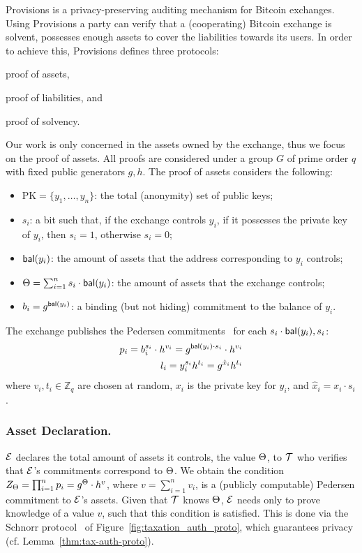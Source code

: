 Provisions is a privacy-preserving auditing mechanism for Bitcoin exchanges.
Using Provisions a party can verify that a (cooperating) Bitcoin exchange is
solvent, \ie possesses enough assets to cover the liabilities towards its
users. In order to achieve this, Provisions defines three protocols:
\begin{inparaenum}[i)]
    \item proof of assets,
    \item proof of liabilities, and
    \item proof of solvency.
\end{inparaenum}
Our work is only concerned in the assets owned by the exchange, thus we focus
on the proof of assets. All proofs are considered under a group $G$ of prime
order $q$ with fixed public generators $g, h$. The proof of assets considers
the following:
\begin{itemize}
    \item $\text{PK} = \{y_1, \dots, y_n \}$: the total (anonymity) set of public keys;
    \item $s_i$: a bit such that, if the exchange controls $y_i$, \ie if it possesses the private key of $y_i$, then $s_i = 1$, otherwise $s_i = 0$;
    \item $\mathsf{bal}(y_i)$: the amount of assets that the address corresponding to $y_i$ controls;
    \item $\Theta = \sum_{i = 1}^n s_i \cdot \mathsf{bal}(y_i)$: the amount of assets that the exchange controls;
    \item $b_i = g^{\mathsf{bal}(y_i)}$: a binding (but not hiding) commitment  to the balance of $y_i$.
\end{itemize}
The exchange publishes the Pedersen commitments~\cite{C:Pedersen91} for each $s_i \cdot
\mathsf{bal}(y_i), s_i$:
\begin{align}
    p_i = b_i^{s_i} \cdot h^{v_i} = g^{\mathsf{bal}(y_i) \cdot s_i} \cdot h^{v_i} \label{eq:balance-commit} \\
    l_i = y_i^{s_i}h^{t_i} =  g^{\hat{x}_i}h^{t_i} \label{eq:ownership-commit}
\end{align}
where $v_i, t_i \in \mathbb{Z}_q$ are chosen at random,
$x_i$ is the private key for $y_i$, and $\hat{x}_i = x_i \cdot s_i$.

\subsubsection*{Asset Declaration.}\label{subsec:tax-authority-proto}
 $\mathcal{E}$ declares the total amount of assets
it controls, \ie the value $\Theta$,
to  $\mathcal{T}$ who verifies  that $\mathcal{E}$'s commitments
correspond to $\Theta$. We obtain the condition
$Z_\Theta = \prod_{i = 1}^n p_i = g^{\Theta} \cdot h^v$,
where $v = {\sum_{i = 1}^n v_i}$, is a (publicly
computable) Pedersen commitment to $\mathcal{E}$'s assets. Given that $\mathcal{T}$
knows $\Theta$, $\mathcal{E}$ needs only to prove knowledge of a value $v$, such
that this condition is satisfied. This is done via the Schnorr
protocol~\cite{C:Schnorr89} of Figure~\ref{fig:taxation_auth_proto}, which
guarantees privacy (cf. Lemma~\ref{thm:tax-auth-proto}).

